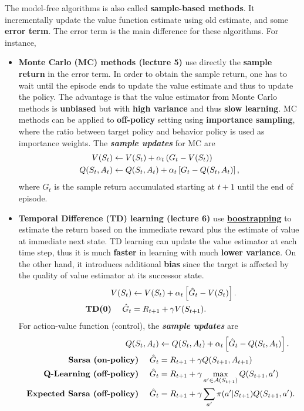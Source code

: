 \documentclass[11pt]{article}
\begin{document}
\begin{itemize}
\begin{itemize}
The model-free algorithms is also called \textbf{sample-based methods}. It incrementally update the value function estimate using old estimate, and some \textbf{error term}. The error term is the main difference for these algorithms. For instance,
\begin{itemize}
\item  \textbf{Monte Carlo (MC) methods (lecture 5)} use directly the \textbf{sample return} in the error term. In order to obtain the sample return, one has to wait until the episode ends to update the value estimate and thus to update the policy. The advantage is that the value estimator from Monte Carlo methods is \textbf{unbiased} but with \textbf{high variance} and thus \textbf{slow learning}. MC methods can be applied to \textbf{off-policy} setting using \textbf{importance sampling}, where the ratio between target policy and behavior policy is used as importance weights.  The \emph{\textbf{sample updates}} for MC are
\begin{align*}
V(S_{t}) &\leftarrow V(S_{t}) + \alpha_{t}\left(G_{t} - V(S_{t})\right) \\
Q(S_{t}, A_{t}) &\leftarrow Q(S_{t}, A_{t}) + \alpha_{t}\left[G_{t}  - Q(S_{t}, A_{t})\right],
\end{align*} where $G_{t}$ is the sample return accumulated starting at $t+1$ until the end of episode.

\item  \textbf{Temporal Difference (TD) learning (lecture 6)} use \underline{\textbf{boostrapping}} to estimate the return based on the immediate reward plus the estimate of value at immediate next state. TD learning can update the value estimator at each time step, thus it is much \textbf{faster} in learning with much \textbf{lower variance}. On the other hand, it introduces additional \textbf{bias} since the target is affected by the quality of value estimator at its successor state.
\begin{align*}
V(S_{t}) &\leftarrow V(S_{t}) + \alpha_{t}\left[\hat{G}_{t}  -  V(S_{t})\right]. \\
 \text{  \textbf{TD(0)} }\quad\hat{G}_{t} &= R_{t+1} + \gamma V(S_{t+1}).
\end{align*} For action-value function (control), the \emph{\textbf{sample updates}} are
\begin{align*}
Q(S_{t}, A_{t}) &\leftarrow Q(S_{t}, A_{t}) + \alpha_{t}\left[\hat{G}_{t}  - Q(S_{t}, A_{t})\right].  \\
 \text{  \textbf{Sarsa (on-policy)} }\quad\hat{G}_{t} &= R_{t+1} + \gamma Q(S_{t+1}, A_{t+1}) \\
\text{  \textbf{Q-Learning (off-policy)} }\quad\hat{G}_{t} &=  R_{t+1} + \gamma \max_{a'\in {\mathcal A}(S_{t+1})}Q(S_{t+1}, a')  \\
 \text{  \textbf{Expected Sarsa (off-policy)} }\quad\hat{G}_{t} &= R_{t+1} + \gamma\sum_{a'}\pi(a'|S_{t+1})Q(S_{t+1}, a') .
\end{align*}
\end{itemize}
\end{itemize}
\end{itemize} 
\end{document}
